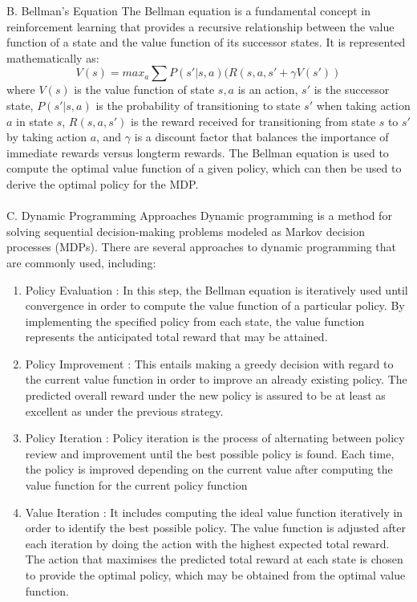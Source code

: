 \documentclass[conference]{IEEEtran}
\begin{document}
B. Bellman’s Equation
The Bellman equation is a fundamental concept in reinforcement learning that provides a recursive relationship between
the value function of a state and the value function of its
successor states. It is represented mathematically as:
$$V(s) = max_a \sum P(s'|s,a)(R(s,a,s'+ \gamma V(s'))$$
where $V(s)$ is the value function of state $s, a$ is an
action, $s'$ is the successor state, $P(s'|s, a)$ is the probability
of transitioning to state $s'$ when taking action $a$ in state $s$, $R(s,a,s')$ is the reward received for transitioning from state
$s$ to $s'$ by taking action $a$, and $\gamma$ is a discount factor that
balances the importance of immediate rewards versus longterm rewards. The Bellman equation is used to compute the optimal value function of a given policy, which can then be used to derive the optimal policy for the MDP.
\\ \\
C. Dynamic Programming Approaches
Dynamic programming is a method for solving sequential decision-making problems modeled as Markov decision processes (MDPs). There are several approaches to dynamic programming that are commonly used, including:
\begin{enumerate}
    \item Policy Evaluation : In this step, the Bellman equation is iteratively used until convergence in order to compute the value function of a particular policy. By implementing the specified policy from each state, the value function represents the anticipated total reward that may be attained.
    \item Policy Improvement : This entails making a greedy decision with regard to the current value function in order to improve an already existing policy. The predicted overall reward under the new policy is assured to be at least as excellent as under the previous strategy.
    \item Policy Iteration :     Policy iteration is the process of alternating between policy review and improvement until the best possible policy is found. Each time, the policy is improved depending on the current value after computing the value function for the current policy function
    \item Value Iteration : It includes computing the ideal value function iteratively in order to identify the best possible policy. The value function is adjusted after each iteration by doing the action with the highest expected total reward.
The action that maximises the predicted total reward at each state is chosen to provide the optimal policy, which may be obtained from the optimal value function.
\end{enumerate}
\end{document}
